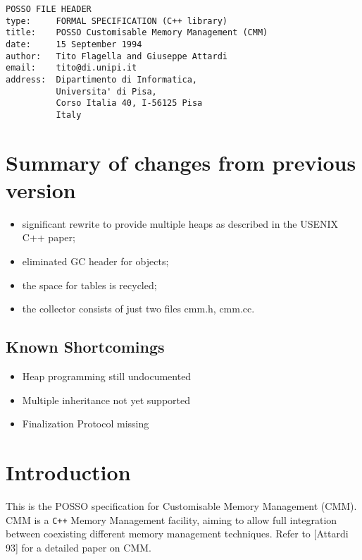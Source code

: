 \def\theenumi{\alph{enumi}}
\def\labelenumi{(\alph{enumi})}
\pagestyle{myheadings}

\begin{verbatim}
POSSO FILE HEADER
type:     FORMAL SPECIFICATION (C++ library)
title:    POSSO Customisable Memory Management (CMM)
date:     15 September 1994
author:   Tito Flagella and Giuseppe Attardi
email:    tito@di.unipi.it
address:  Dipartimento di Informatica,
          Universita' di Pisa,
          Corso Italia 40, I-56125 Pisa
          Italy
\end{verbatim}

\section{Summary of changes from previous version}
\begin{itemize}
\item significant rewrite to provide multiple heaps as described in the
USENIX C++ paper;
\item eliminated GC header for objects;
\item the space for tables is recycled;
\item the collector consists of just two files cmm.h, cmm.cc.
\end{itemize}

\subsection {Known Shortcomings}
\begin{itemize}
\item Heap programming still undocumented
\item Multiple inheritance not yet supported
\item Finalization Protocol missing
\end{itemize}

\section {Introduction}

This is the POSSO specification for Customisable Memory Management (CMM).
CMM is a {\tt C++} Memory Management facility, aiming to
allow full integration between coexisting different memory
management techniques.  Refer to [Attardi 93] for a detailed paper on CMM.

